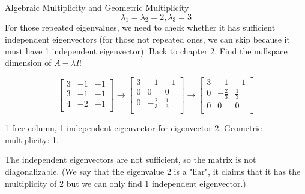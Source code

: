 \documentclass{beamer}
\begin{document}
\begin{frame}{Algebraic Multiplicity and Geometric Multiplicity}
\begin{equation*}
    \lambda _1=\lambda _2=2,\lambda _3=3
\end{equation*}
For those repeated eigenvalues, we need to check whether it has sufficient independent eigenvectors (for those not repeated ones, we can skip because it must have 1 independent eigenvector). Back to chapter 2, Find the nullspace dimension of $A-\lambda I$!

\begin{equation*}
    \left[ \begin{matrix}
        3&		-1&		-1\\
        3&		-1&		-1\\
        4&		-2&		-1\\
    \end{matrix} \right] \rightarrow \left[ \begin{matrix}
        3&		-1&		-1\\
        0&		0&		0\\
        0&		-\frac{2}{3}&		\frac{1}{3}\\
    \end{matrix} \right] \rightarrow \left[ \begin{matrix}
        3&		-1&		-1\\
        0&		-\frac{2}{3}&		\frac{1}{3}\\
        0&		0&		0\\
    \end{matrix} \right]
\end{equation*}

1 free column, 1 independent eigenvector for eigenvector $2$. Geometric multiplicity: 1.
\vspace{3pt}

The independent eigenvectors are not sufficient, so the matrix is not diagonalizable. (We say that the eigenvalue 2 is a "liar", it claims that it has the multiplicity of 2 but we can only find 1 independent eigenvector.)
\end{frame}
\end{document}
